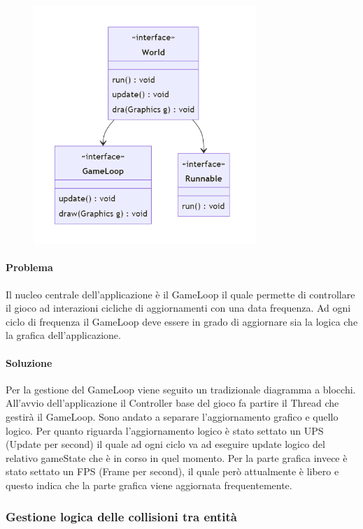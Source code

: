 \documentclass[a4paper,12pt]{report}
\begin{document}
\begin{figure}[H]
    \centering{}
    \includegraphics[width=0.75\textwidth]{img/UMLGameLoop.png}
    \caption{}
\end{figure}

\paragraph{Problema} Il nucleo centrale dell’applicazione è il GameLoop il quale permette di controllare il gioco ad interazioni cicliche di aggiornamenti con una data frequenza. Ad ogni ciclo di frequenza il GameLoop deve essere in grado di aggiornare sia la logica che la grafica dell’applicazione.

\paragraph{Soluzione} Per la gestione del GameLoop viene seguito un tradizionale diagramma a blocchi. All’avvio dell’applicazione il Controller base del gioco fa partire il Thread che gestirà il GameLoop. Sono andato a separare l’aggiornamento grafico e quello logico. Per quanto riguarda l'aggiornamento logico è stato settato un UPS (Update per second) il quale ad ogni ciclo va ad eseguire update logico del relativo gameState che è in corso in quel momento. Per la parte grafica invece è stato settato un FPS (Frame per second), il quale però attualmente è libero e questo indica che la parte grafica viene aggiornata frequentemente.

\subsubsection{Gestione logica delle collisioni tra entità}
\end{document}
